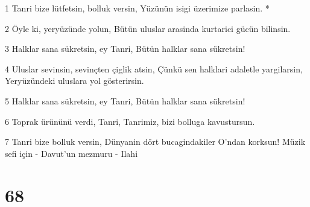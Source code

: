 \par 1 Tanri bize lütfetsin, bolluk versin, Yüzünün isigi üzerimize parlasin. *
\par 2 Öyle ki, yeryüzünde yolun, Bütün uluslar arasinda kurtarici gücün bilinsin.
\par 3 Halklar sana sükretsin, ey Tanri, Bütün halklar sana sükretsin!
\par 4 Uluslar sevinsin, sevinçten çiglik atsin, Çünkü sen halklari adaletle yargilarsin, Yeryüzündeki uluslara yol gösterirsin.
\par 5 Halklar sana sükretsin, ey Tanri, Bütün halklar sana sükretsin!
\par 6 Toprak ürününü verdi, Tanri, Tanrimiz, bizi bolluga kavustursun.
\par 7 Tanri bize bolluk versin, Dünyanin dört bucagindakiler O'ndan korksun! Müzik sefi için - Davut'un mezmuru - Ilahi

\chapter{68}

